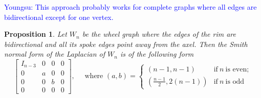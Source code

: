 \documentclass[11pt,reqno]{amsart}
\newcommand{\youngsu}[1]{{\textcolor{blue}{Youngsu: #1}}}
\theoremstyle{definition}
\theoremstyle{plain}
\newtheorem{proposition}[mydef]{Proposition}
\begin{document}
\youngsu{This approach probably works for complete graphs where all edges are bidirectional except for one vertex.}

\begin{proposition}
Let $W_n$ be the wheel graph where the edges of the rim are bidirectional and all its spoke edges point away from the axel. Then the Smith normal form of the Laplacian of $W_n$ is of the following form 
\begin{equation*}
\left[
\begin{array}{c|ccc}	
I_{n-3} & 0 & 0 & 0 \\
\hline
0 & a & 0 & 0 \\
0 & 0 & b & 0 \\
0 & 0 & 0 & 0 
\end{array}
\right], \quad \textrm{ where } (a,b) = \begin{cases}
	(n-1,n-1) & \text{if}~ n ~\text{is even}; \\
	(\frac{n-1}2, 2(n-1)) & \text{if}~ n ~\text{is odd}
\end{cases}
\end{equation*}
\end{proposition}
\end{document}
